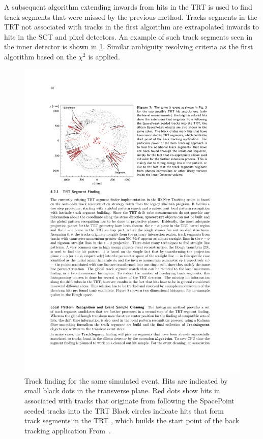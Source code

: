 A subsequent algorithm extending inwards from hits in the TRT is used to find track segments that were missed by the previous method. Tracks segments in the TRT not associated with tracks in the first algorithm are extrapolated inwards to hits in the SCT and pixel detectors. An example of such track segments seen in the inner detector is shown in \cref{fig:method:tracking-outside-in}. Similar ambiguity resolving criteria as the first algorithm based on the $\chi^2$ is applied. 
\begin{figure}[]
    \centering
    \includegraphics[width=\mediumfigwidth]{images/tracking-outside-in.pdf}
    \caption[Track finding for a simulated \ttbar event]{Track finding for the same simulated \ttbar event.
    Hits are indicated by small black dots in the transverse plane.
    Red dots show hits in associated with tracks that originate from following the SpacePoint seeded tracks into the TRT
    Black circles indicate hits that form track segments in the TRT , which builds the start point of the back tracking application
        From~\cite{ATLAS:tracking}.}
    \label{fig:method:tracking-outside-in}
\end{figure}

